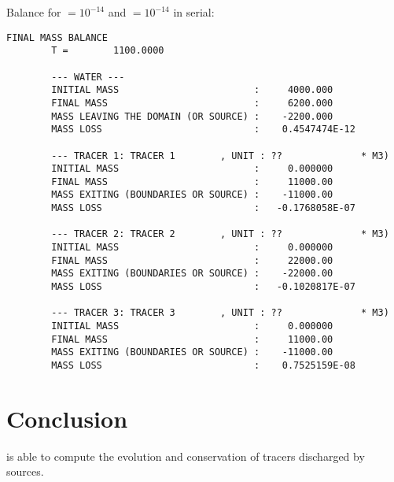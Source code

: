 Balance for  $= 10^{-14}$ and
 $= 10^{-14}$ in serial:
%
\begin{lstlisting}[language=TelFortran]
                        FINAL MASS BALANCE
        T =        1100.0000

        --- WATER ---
        INITIAL MASS                        :     4000.000
        FINAL MASS                          :     6200.000
        MASS LEAVING THE DOMAIN (OR SOURCE) :    -2200.000
        MASS LOSS                           :    0.4547474E-12

        --- TRACER 1: TRACER 1        , UNIT : ??              * M3)
        INITIAL MASS                        :     0.000000
        FINAL MASS                          :     11000.00
        MASS EXITING (BOUNDARIES OR SOURCE) :    -11000.00
        MASS LOSS                           :   -0.1768058E-07

        --- TRACER 2: TRACER 2        , UNIT : ??              * M3)
        INITIAL MASS                        :     0.000000
        FINAL MASS                          :     22000.00
        MASS EXITING (BOUNDARIES OR SOURCE) :    -22000.00
        MASS LOSS                           :   -0.1020817E-07

        --- TRACER 3: TRACER 3        , UNIT : ??              * M3)
        INITIAL MASS                        :     0.000000
        FINAL MASS                          :     11000.00
        MASS EXITING (BOUNDARIES OR SOURCE) :    -11000.00
        MASS LOSS                           :    0.7525159E-08
\end{lstlisting}
%
\section{Conclusion}
%
 is able to compute the evolution and conservation of
tracers discharged by sources.
%
